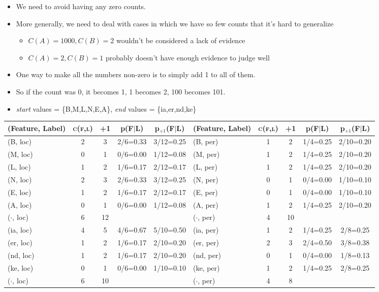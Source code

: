 \documentclass[11pt,letterpaper]{article}
\begin{document}
\begin{itemize}
  \item We need to avoid having any zero counts.
  \item More generally, we need to deal with cases in which we have so few counts that it's hard to generalize
    \begin{itemize}
      \item $C(A)=1000, C(B)=2$ wouldn't be considered a lack of evidence
      \item $C(A)=2, C(B)=1$ probably doesn't have enough evidence to judge well
    \end{itemize}

  \item One way to make all the numbers non-zero is to simply add 1 to all of them.
  \item So if the count was 0, it becomes 1, 1 becomes 2, 100 becomes 101.
  \item \textit{start} values = \{B,M,L,N,E,A\}, \textit{end} values = \{ia,er,nd,ke\}
\end{itemize}
   \begin{tabular}{|p{15mm}cccc|p{15mm}cccc|}
     \hline
     (Feature, Label) & \textsc{c(f,l)} & +1 & p(F$\mid$L) & p$_{+1}$(F$\mid$L) & (Feature, Label) & \textsc{c(f,l)} & +1 & p(F$\mid$L) & p$_{+1}$(F$\mid$L) \\
     \hline
     \hline
     (B, loc) & 2 & 3 & 2/6=0.33 & 3/12=0.25  &  (B, per) & 1 & 2 & 1/4=0.25 & 2/10=0.20  \\
     (M, loc) & 0 & 1 & 0/6=0.00 & 1/12=0.08  &  (M, per) & 1 & 2 & 1/4=0.25 & 2/10=0.20  \\
     (L, loc) & 1 & 2 & 1/6=0.17 & 2/12=0.17  &  (L, per) & 1 & 2 & 1/4=0.25 & 2/10=0.20  \\
     (N, loc) & 2 & 3 & 2/6=0.33 & 3/12=0.25  &  (N, per) & 0 & 1 & 0/4=0.00 & 1/10=0.10  \\
     (E, loc) & 1 & 2 & 1/6=0.17 & 2/12=0.17  &  (E, per) & 0 & 1 & 0/4=0.00 & 1/10=0.10  \\
     (A, loc) & 0 & 1 & 0/6=0.00 & 1/12=0.08  &  (A, per) & 1 & 2 & 1/4=0.25 & 2/10=0.20  \\
     \hline
     ($\cdot$, loc) & 6 & 12 & &             & ($\cdot$, per) & 4 & 10 & & \\
     \hline
     \hline
     (ia, loc) & 4 & 5 & 4/6=0.67 & 5/10=0.50  &  (ia, per) & 1 & 2 & 1/4=0.25 & 2/8=0.25  \\
     (er, loc) & 1 & 2 & 1/6=0.17 & 2/10=0.20  &  (er, per) & 2 & 3 & 2/4=0.50 & 3/8=0.38  \\
     (nd, loc) & 1 & 2 & 1/6=0.17 & 2/10=0.20  &  (nd, per) & 0 & 1 & 0/4=0.00 & 1/8=0.13  \\
     (ke, loc) & 0 & 1 & 0/6=0.00 & 1/10=0.10  &  (ke, per) & 1 & 2 & 1/4=0.25 & 2/8=0.25  \\
     \hline
     ($\cdot$, loc) & 6 & 10 & &              & ($\cdot$, per) & 4 & 8 & & \\
     \hline
   \end{tabular}
\end{document}
